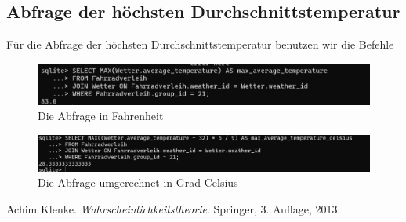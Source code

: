 \documentclass[a4paper,11pt]{article}
\begin{document}
\subsection{Abfrage der höchsten Durchschnittstemperatur}

Für die Abfrage der höchsten Durchschnittstemperatur benutzen wir die Befehle 

\begin{figure}[h]
\centering
\includegraphics[scale=.5]{Abfrage.png}
\caption{Die Abfrage in Fahrenheit}
\label{fig:meine-grafik3}
\end{figure}

\begin{figure}[h]
\centering
\includegraphics[scale=.4]{Abfrage Celsius.png}
\caption{Die Abfrage umgerechnet in Grad Celsius}
\label{fig:meine-grafik4}
\end{figure}

\begin{thebibliography}{9}
Achim Klenke. \textit{Wahrscheinlichkeitstheorie}. Springer, 3. Auflage, 2013.
\end{thebibliography}
\end{document}
